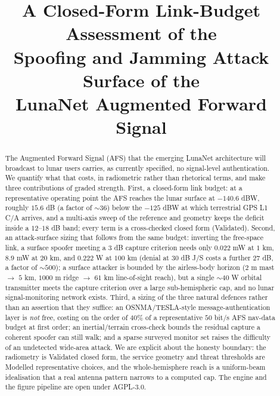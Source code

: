 \documentclass[conference]{IEEEtran}
\begin{document}
\title{A Closed-Form Link-Budget Assessment of the\\
Spoofing and Jamming Attack Surface of the\\
LunaNet Augmented Forward Signal}

\author{
}

\maketitle

\begin{abstract}
The Augmented Forward Signal (AFS) that the emerging LunaNet architecture will
broadcast to lunar users carries, as currently specified, no signal-level
authentication. We quantify what that costs, in radiometric rather than rhetorical
terms, and make three contributions of graded strength. First, a closed-form
link budget: at a representative operating point the AFS reaches the lunar surface
at $-140.6$ dBW, roughly $15.6$ dB (a factor of $\sim$$36$) below the $-125$ dBW at
which terrestrial GPS L1 C/A arrives, and a multi-axis sweep of the reference and
geometry keeps the deficit inside a $12$--$18$ dB band; every term is a
cross-checked closed form (Validated). Second, an attack-surface sizing that follows
from the same budget: inverting the free-space link, a surface spoofer meeting a
$3$ dB capture criterion needs only $0.022$ mW at $1$ km, $8.9$ mW at $20$ km, and
$0.222$ W at $100$ km (denial at $30$ dB J/S costs a further $27$ dB, a factor
of $\sim$$500$); a surface attacker is bounded by the airless-body horizon
($2$ m mast $\to$ $5$ km, $1000$ m ridge $\to$ $61$ km line-of-sight reach), but a
single $\sim$$40$ W orbital transmitter meets the capture criterion over a large
sub-hemispheric cap, and no lunar signal-monitoring network exists. Third, a
sizing of the three natural defences rather than an assertion that they suffice:
an OSNMA/TESLA-style message-authentication layer is \emph{not} free, costing on the
order of $40\%$ of a representative $50$ bit/s AFS nav-data budget at first order;
an inertial/terrain cross-check bounds the residual capture a coherent spoofer can
still walk; and a sparse surveyed monitor set raises the difficulty of an
undetected wide-area attack. We are explicit about the honesty boundary: the
radiometry is Validated closed form, the service geometry and threat thresholds are
Modelled representative choices, and the whole-hemisphere reach is a uniform-beam
idealisation that a real antenna pattern narrows to a computed cap. The engine and
the figure pipeline are open under AGPL-3.0.
\end{abstract}
\end{document}
